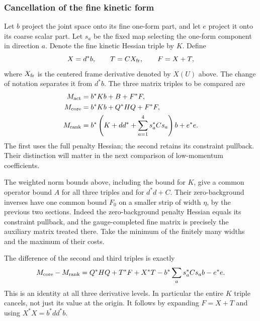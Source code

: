 \subsubsection{Cancellation of the fine kinetic form}
Let $b$ project the joint space onto its fine one-form part, and let
$e$ project it onto its coarse scalar part. Let $s_a$ be the fixed
map selecting the one-form component in direction $a$. Denote the
fine kinetic Hessian triple by $K$. Define
\[
 X=d^*b,\qquad T=CX_{\rm fr},\qquad F=X+T,
\]
where $X_{\rm fr}$ is the centered frame derivative denoted by
$X(U)$ above. The change of notation separates it from $d^*b$.
The three matrix triples to be compared are
\begin{align*}
 M_{\rm act}&=b^*Kb+B+F^*F,\\
 M_{\rm core}&=b^*Kb+Q^*HQ+F^*F,\\
 M_{\rm rank}&=b^*\left(K+dd^*+\sum_{a=1}^4s_a^*Cs_a\right)b+e^*e.
\end{align*}
The first uses the full penalty Hessian; the second retains its
constraint pullback. Their distinction will matter in the next
comparison of low-momentum coefficients.

The weighted norm bounds above, including the bound for $K$, give
a common operator bound $A$ for all three triples and for
$d^*d+C$. Their zero-background inverses have one common bound
$F_0$ on a smaller strip of width $\eta$, by the previous two
sections. Indeed the zero-background penalty Hessian equals its
constraint pullback, and the gauge-completed fine matrix is precisely
the auxiliary matrix treated there. Take the minimum of the finitely
many widths and the maximum of their costs.

The difference of the second and third triples is exactly
\begin{equation}\label{eq:ex-core-rank-difference}
 M_{\rm core}-M_{\rm rank}
 =Q^*HQ+T^*F+X^*T-b^*\sum_a s_a^*Cs_ab-e^*e.
\end{equation}
This is an identity at all three derivative levels. In particular
the entire $K$ triple cancels, not just its value at the origin.
It follows by expanding $F=X+T$ and using $X^*X=b^*dd^*b$.

